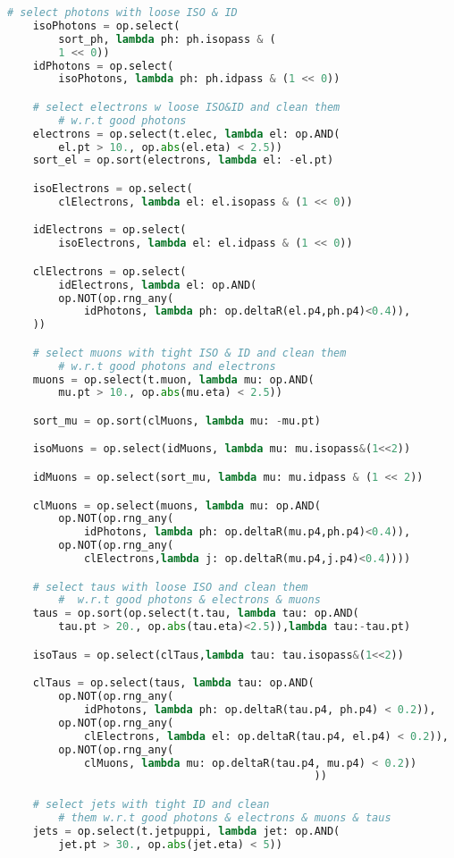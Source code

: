 \begin{lstlisting}[language=Python, caption=Python module of the analysis used in Bamboo framework, label={bamboocode}]
    # select photons with loose ISO & ID
    isoPhotons = op.select(
        sort_ph, lambda ph: ph.isopass & (
        1 << 0))
    idPhotons = op.select(
        isoPhotons, lambda ph: ph.idpass & (1 << 0))

    # select electrons w loose ISO&ID and clean them
        # w.r.t good photons
    electrons = op.select(t.elec, lambda el: op.AND(
        el.pt > 10., op.abs(el.eta) < 2.5))
    sort_el = op.sort(electrons, lambda el: -el.pt)

    isoElectrons = op.select(
        clElectrons, lambda el: el.isopass & (1 << 0))

    idElectrons = op.select(
        isoElectrons, lambda el: el.idpass & (1 << 0))

    clElectrons = op.select(
        idElectrons, lambda el: op.AND(
        op.NOT(op.rng_any(
            idPhotons, lambda ph: op.deltaR(el.p4,ph.p4)<0.4)),
    ))

    # select muons with tight ISO & ID and clean them
        # w.r.t good photons and electrons
    muons = op.select(t.muon, lambda mu: op.AND(
        mu.pt > 10., op.abs(mu.eta) < 2.5))

    sort_mu = op.sort(clMuons, lambda mu: -mu.pt)

    isoMuons = op.select(idMuons, lambda mu: mu.isopass&(1<<2))

    idMuons = op.select(sort_mu, lambda mu: mu.idpass & (1 << 2))

    clMuons = op.select(muons, lambda mu: op.AND(
        op.NOT(op.rng_any(
            idPhotons, lambda ph: op.deltaR(mu.p4,ph.p4)<0.4)),
        op.NOT(op.rng_any(
            clElectrons,lambda j: op.deltaR(mu.p4,j.p4)<0.4))))

    # select taus with loose ISO and clean them
        #  w.r.t good photons & electrons & muons
    taus = op.sort(op.select(t.tau, lambda tau: op.AND(
        tau.pt > 20., op.abs(tau.eta)<2.5)),lambda tau:-tau.pt)

    isoTaus = op.select(clTaus,lambda tau: tau.isopass&(1<<2))

    clTaus = op.select(taus, lambda tau: op.AND(
        op.NOT(op.rng_any(
            idPhotons, lambda ph: op.deltaR(tau.p4, ph.p4) < 0.2)),
        op.NOT(op.rng_any(
            clElectrons, lambda el: op.deltaR(tau.p4, el.p4) < 0.2)),
        op.NOT(op.rng_any(
            clMuons, lambda mu: op.deltaR(tau.p4, mu.p4) < 0.2))
                                                ))

    # select jets with tight ID and clean 
        # them w.r.t good photons & electrons & muons & taus
    jets = op.select(t.jetpuppi, lambda jet: op.AND(
        jet.pt > 30., op.abs(jet.eta) < 5))


\end{lstlisting}
